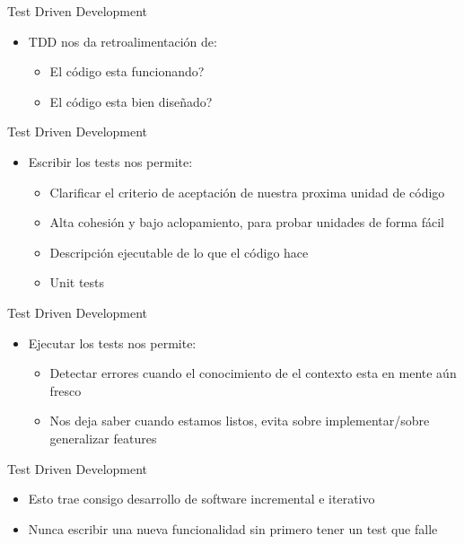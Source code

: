 \begin{frame}{Test Driven Development} 
    \begin{itemize}
        \item TDD nos da retroalimentación de:
        \begin{itemize}
            \item El código esta funcionando?
            \item El código esta bien diseñado?
        \end{itemize}
    \end{itemize}
\end{frame}

\begin{frame}{Test Driven Development} 
    \begin{itemize}
        \item Escribir los tests nos permite:
        \begin{itemize}
            \item Clarificar el criterio de aceptación de nuestra proxima unidad de código
            \item Alta cohesión y bajo aclopamiento, para probar unidades de forma fácil
            \item Descripción ejecutable de lo que el código hace
            \item Unit tests
        \end{itemize}
    \end{itemize}
\end{frame}

\begin{frame}{Test Driven Development} 
    \begin{itemize}
        \item Ejecutar los tests nos permite:
        \begin{itemize}
            \item Detectar errores cuando el conocimiento de el contexto esta en mente aún fresco
            \item Nos deja saber cuando estamos listos, evita sobre implementar/sobre generalizar features
        \end{itemize}
    \end{itemize}
\end{frame}

\begin{frame}{Test Driven Development} 
    \begin{itemize}
        \item Esto trae consigo desarrollo de software incremental e iterativo
    \end{itemize}
    \begin{itemize}
        \item Nunca escribir una nueva funcionalidad sin primero tener un test que falle
    \end{itemize}
\end{frame}


